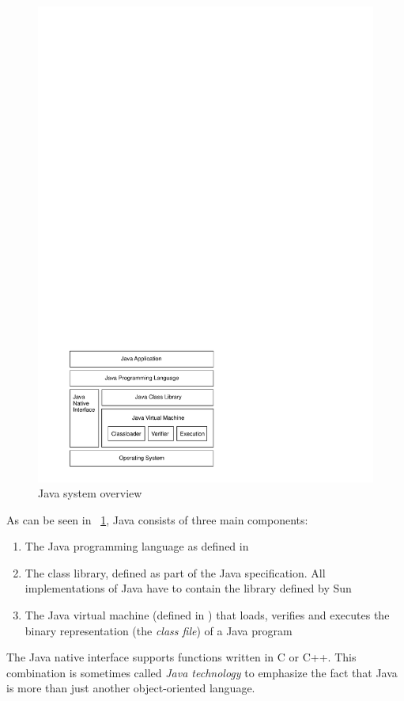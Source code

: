 %
\begin{figure}
    \centering
    \includegraphics[scale=\picscale]{intro/java_overview}
    \caption{Java system overview}
    \label{fig:java:overview}
\end{figure}
%
As can be seen in \figurename~\ref{fig:java:overview}, Java consists
of three main components:
%
\begin{enumerate}
    \item The Java programming language as defined in
    \cite{JavaLangSpec2}
    \item The class library, defined as part of the Java
    specification. All implementations of Java have to contain the
    library defined by Sun
    \item The Java virtual machine (defined in \cite{jvm}) that loads,
     verifies and executes the binary representation (the
\emph{class file}) of a Java program
\end{enumerate}
%
The Java native interface supports functions written in C or C++.
This combination is sometimes called \emph{Java technology} to
emphasize the fact that Java is more than just another
object-oriented language.


